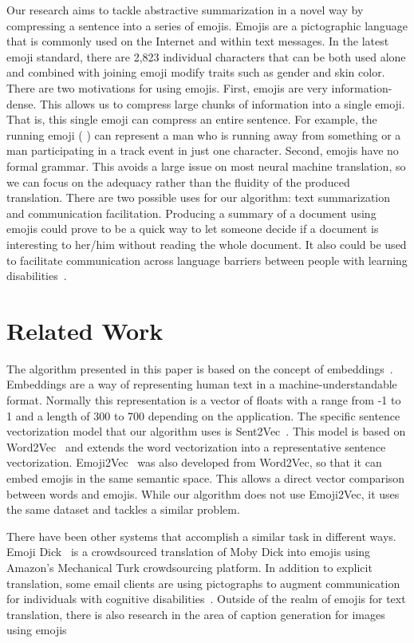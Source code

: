 \documentclass{article}[10]
\newcommand*{\img}[1]{%
  \raisebox{-.3\baselineskip}{%
    \texttt{[image: \#1]}%
  }%
}
\begin{document}
Our research aims to tackle abstractive summarization in a novel way by compressing a sentence into a series of emojis. Emojis are a pictographic language that is commonly used on the Internet and within text messages. In the latest emoji standard, there are 2,823 individual characters that can be both used alone and combined with joining emoji modify traits such as gender and skin color. There are two motivations for using emojis. First, emojis are very information-dense. This allows us to compress large chunks of information into a single emoji. That is, this single emoji can compress an entire sentence. For example, the running emoji (\img{emojis/1f3c3.png}) can represent a man who is running away from something or a man participating in a track event in just one character. Second, emojis have no formal grammar. This avoids a large issue on most neural machine translation, so we can focus on the adequacy rather than the fluidity of the produced translation. There are two possible uses for our algorithm: text summarization and communication facilitation. Producing a summary of a document using emojis could prove to be a quick way to let someone decide if a document is interesting to her/him without reading the whole document. It also could be used to facilitate communication across language barriers between people with learning disabilities~\cite{vandeghinste2017translating}.

\section{Related Work}
The algorithm presented in this paper is based on the concept of embeddings~\cite{WhatAreW70}. Embeddings are a way of representing human text in a machine-understandable format. Normally this representation is a vector of floats with a range from -1 to 1 and a length of 300 to 700 depending on the application. The specific sentence vectorization model that our algorithm uses is Sent2Vec~\cite{pg2017unsu}. This model is based on Word2Vec~\cite{mikolov2013efficient} and extends the word vectorization into a representative sentence vectorization. Emoji2Vec~\cite{Eisner_2016} was also developed from Word2Vec, so that it can embed emojis in the same semantic space. This allows a direct vector comparison between words and emojis. While our algorithm does not use Emoji2Vec, it uses the same dataset and tackles a similar problem.

There have been other systems that accomplish a similar task in different ways. Emoji Dick~\cite{radford2016telephone} is a crowdsourced translation of Moby Dick into emojis using Amazon's Mechanical Turk crowdsourcing platform. In addition to explicit translation, some email clients are using pictographs to augment communication for individuals with cognitive disabilities~\cite{vandeghinste2017translating}. Outside of the realm of emojis for text translation, there is also research in the area of caption generation for images using emojis~\cite{mazoure-etal-2018-emojigan,cappallo2015image2emoji}
\end{document}
